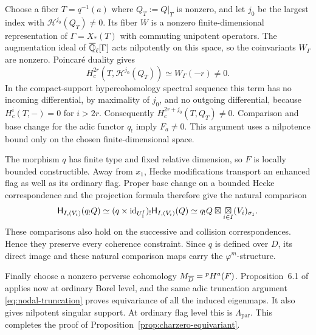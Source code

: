 Choose a fiber $T=q^{-1}(a)$ where $Q_T:=Q|_T$ is nonzero, and let
$j_0$ be the largest index with $\mathcal H^{j_0}(Q_T)\ne0$.
Its fiber $W$ is a nonzero finite-dimensional representation of
$\Gamma=X_*(T)$ with commuting unipotent operators.  The
augmentation ideal of $\overline{\mathbb Q}_{\ell}[\Gamma]$ acts nilpotently on this space,
so the coinvariants $W_\Gamma$ are nonzero.  Poincar\'e duality gives
\[
 H_c^{2r}(T,\mathcal H^{j_0}(Q_T))
       \simeq W_\Gamma(-r)\ne0.
\]
In the compact-support hypercohomology spectral sequence this term
has no incoming differential, by maximality of $j_0$, and no
outgoing differential, because $H_c^i(T,-)=0$ for $i>2r$.
Consequently $H_c^{2r+j_0}(T,Q_T)\ne0$.  Comparison and base change
for the adic functor $q_!$ imply $F_a\ne0$.  This argument uses a
nilpotence bound only on the chosen finite-dimensional space.

The morphism $q$ has finite type and fixed relative dimension, so
$F$ is locally bounded constructible.  Away from $x_1$, Hecke
modifications transport an enhanced flag as well as its ordinary
flag.  Proper base change on a bounded Hecke correspondence and
the projection formula therefore give the natural comparison
\begin{equation}\label{eq:nodal-torus-hecke}
 \mathsf H_{I,(V_i)}(q_!Q)
 \simeq (q\times\mathrm{id}_{U_1^I})_!\mathsf H_{I,(V_i)}(Q)
 \simeq q_!Q\boxtimes
                  \mathop{\boxtimes}_{i\in I}(V_i)_{\sigma_1}.
\end{equation}
These comparisons also hold on the successive and collision
correspondences.  Hence they preserve every coherence constraint.
Since $q$ is defined over $D$, its direct image and these natural
comparison maps carry the $\varphi^m$-structure.

Finally choose a nonzero perverse cohomology
$M_{\overline D}={}^pH^a(F)$.  Proposition~6.1 of \cite{CT} applies now
at ordinary Borel level, and the same adic truncation argument
\eqref{eq:nodal-truncation} proves equivariance of all the induced
eigenmaps.  It also gives nilpotent singular support.  At ordinary
flag level this is $\Lambda_{\mathrm{par}}$.
This completes the proof of Proposition~\ref{prop:charzero-equivariant}.
